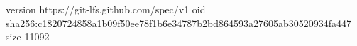 version https://git-lfs.github.com/spec/v1
oid sha256:c1820724858a1b09f50ee78f1b6e34787b2bd864593a27605ab30520934fa447
size 11092
